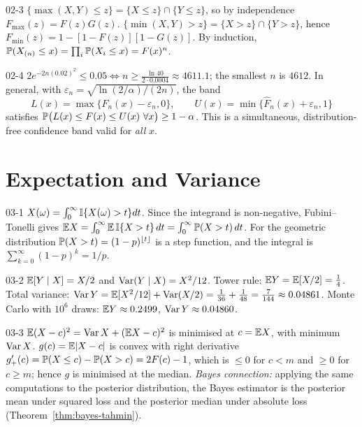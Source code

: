 \begin{solution}{02-3}
$\{\max(X,Y)\le z\}=\{X\le z\}\cap\{Y\le z\}$, so by independence $F_{\max}(z)=F(z)G(z)$. $\{\min(X,Y)>z\}=\{X>z\}\cap\{Y>z\}$, hence $F_{\min}(z)=1-[1-F(z)][1-G(z)]$. By induction, $\P(X_{(n)}\le x)=\prod_i\P(X_i\le x)=F(x)^n$.
\end{solution}

\begin{solution}{02-4}
$2e^{-2n(0.02)^2}\le0.05\iff n\ge\frac{\ln40}{2\cdot0.0004}\approx4611.1$; the smallest $n$ is $4612$. In general, with $\varepsilon_n=\sqrt{\ln(2/\alpha)/(2n)}$, the band
\[
L(x)=\max\{\hat F_n(x)-\varepsilon_n,0\},\qquad U(x)=\min\{\hat F_n(x)+\varepsilon_n,1\}
\]
satisfies $\P\big(L(x)\le F(x)\le U(x)\ \forall x\big)\ge1-\alpha$. This is a simultaneous, distribution-free confidence band valid for \emph{all} $x$.
\end{solution}

\section{Expectation and Variance}

\begin{solution}{03-1}
$X(\omega)=\int_0^\infty\I\{X(\omega)>t\}dt$. Since the integrand is non-negative, Fubini--Tonelli gives $\E X=\int_0^\infty\E\,\I\{X>t\}\,dt=\int_0^\infty\P(X>t)\,dt$. For the geometric distribution $\P(X>t)=(1-p)^{\lfloor t\rfloor}$ is a step function, and the integral is $\sum_{k=0}^\infty(1-p)^k=1/p$.
\end{solution}

\begin{solution}{03-2}
$\E[Y\mid X]=X/2$ and $\Var(Y\mid X)=X^2/12$. Tower rule: $\E Y=\E[X/2]=\frac14$. Total variance: $\Var Y=\E[X^2/12]+\Var(X/2)=\frac{1}{36}+\frac{1}{48}=\frac{7}{144}\approx0.04861$. Monte Carlo with $10^6$ draws: $\E Y\approx0.2499$, $\Var Y\approx0.04860$.
\end{solution}

\begin{solution}{03-3}
$\E(X-c)^2=\Var X+(\E X-c)^2$ is minimised at $c=\E X$, with minimum $\Var X$. $g(c)=\E|X-c|$ is convex with right derivative $g'_+(c)=\P(X\le c)-\P(X>c)=2F(c)-1$, which is $\le0$ for $c<m$ and $\ge0$ for $c\ge m$; hence $g$ is minimised at the median.
\emph{Bayes connection:} applying the same computations to the posterior distribution, the Bayes estimator is the posterior mean under squared loss and the posterior median under absolute loss (Theorem~\ref{thm:bayes-tahmin}).
\end{solution}

